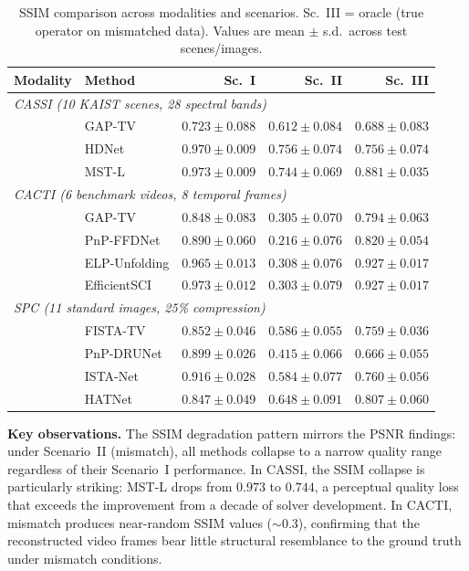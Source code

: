 \documentclass[11pt]{article}
\theoremstyle{definition}
\begin{document}
\begin{table}[htbp]
\centering
\caption{SSIM comparison across modalities and scenarios.
Sc.~III = oracle (true operator on mismatched data).
Values are mean $\pm$ s.d.\ across test scenes/images.}
\label{tab:ssim}
\begin{tabular}{l l r r r}
\toprule
\textbf{Modality} & \textbf{Method} &
  \textbf{Sc.~I} & \textbf{Sc.~II} & \textbf{Sc.~III} \\
\midrule
\multicolumn{5}{l}{\emph{CASSI (10 KAIST scenes, 28 spectral bands)}} \\
\midrule
& GAP-TV   & $0.723 \pm 0.088$ & $0.612 \pm 0.084$ & $0.688 \pm 0.083$ \\
& HDNet    & $0.970 \pm 0.009$ & $0.756 \pm 0.074$ & $0.756 \pm 0.074$ \\
& MST-L    & $0.973 \pm 0.009$ & $0.744 \pm 0.069$ & $0.881 \pm 0.035$ \\
\midrule
\multicolumn{5}{l}{\emph{CACTI (6 benchmark videos, 8 temporal frames)}} \\
\midrule
& GAP-TV        & $0.848 \pm 0.083$ & $0.305 \pm 0.070$ & $0.794 \pm 0.063$ \\
& PnP-FFDNet    & $0.890 \pm 0.060$ & $0.216 \pm 0.076$ & $0.820 \pm 0.054$ \\
& ELP-Unfolding & $0.965 \pm 0.013$ & $0.308 \pm 0.076$ & $0.927 \pm 0.017$ \\
& EfficientSCI  & $0.973 \pm 0.012$ & $0.303 \pm 0.079$ & $0.927 \pm 0.017$ \\
\midrule
\multicolumn{5}{l}{\emph{SPC (11 standard images, 25\% compression)}} \\
\midrule
& FISTA-TV   & $0.852 \pm 0.046$ & $0.586 \pm 0.055$ & $0.759 \pm 0.036$ \\
& PnP-DRUNet & $0.899 \pm 0.026$ & $0.415 \pm 0.066$ & $0.666 \pm 0.055$ \\
& ISTA-Net   & $0.916 \pm 0.028$ & $0.584 \pm 0.077$ & $0.760 \pm 0.056$ \\
& HATNet     & $0.847 \pm 0.049$ & $0.648 \pm 0.091$ & $0.807 \pm 0.060$ \\
\bottomrule
\end{tabular}
\end{table}

\noindent\textbf{Key observations.}
The SSIM degradation pattern mirrors the PSNR findings: under Scenario~II
(mismatch), all methods collapse to a narrow quality range regardless of
their Scenario~I performance. In CASSI, the SSIM collapse is particularly
striking: MST-L drops from $0.973$ to $0.744$, a perceptual quality
loss that exceeds the improvement from a decade of solver development.
In CACTI, mismatch produces near-random SSIM values (${\sim}0.3$),
confirming that the reconstructed video frames bear little structural
resemblance to the ground truth under mismatch conditions.
\end{document}
